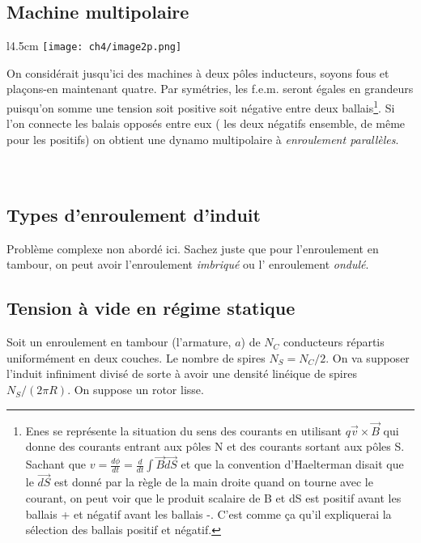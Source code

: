 	\subsection{Machine multipolaire}
	\begin{wrapfigure}[8]{l}{4.5cm}
	\vspace{-5mm}
	\texttt{[image: ch4/image2p.png]}
	\end{wrapfigure}
	On considérait jusqu'ici des machines à deux pôles inducteurs, soyons 
	fous et plaçons-en maintenant quatre. Par symétries, les f.e.m. seront 
	égales en grandeurs puisqu'on somme une tension soit positive soit négative 
	entre deux ballais\footnote{Enes se représente la situation du sens des courants en utilisant $q\vec{v}\times \vec{B}$ qui donne des courants entrant aux pôles N et des courants sortant aux pôles S. Sachant que $v = \frac{d\phi}{dt} = \frac{d}{dt}\int \vec{B} \vec{dS}$ et que la convention d'Haelterman disait que le $\vec{dS}$ est donné par la règle de la main droite quand on tourne avec le courant, on peut voir que le produit scalaire de B et dS est positif avant les ballais + et négatif avant les ballais -. C'est comme ça qu'il expliquerai la sélection des ballais positif et négatif.}. Si l'on connecte les balais opposés entre eux (
	les deux négatifs ensemble, de même pour les positifs) on obtient une 
	dynamo multipolaire à \textit{enroulement parallèles}. \\\\\\
	
	\subsection{Types d'enroulement d'induit}
	Problème complexe non abordé ici. Sachez juste que pour l'enroulement 
	en tambour, on peut avoir l'enroulement \textit{imbriqué} ou l'
	enroulement \textit{ondulé}.
	
	\subsection{Tension à vide en régime statique}
	Soit un enroulement en tambour (l'armature, $a$) de $N_C$ conducteurs 
	répartis uniformément en deux couches. Le nombre de spires $N_S=N_C/2$. 
	On va supposer l'induit infiniment divisé de sorte à avoir une densité 
	linéique de spires $N_S/(2\pi R)$. On suppose un rotor lisse.
	
